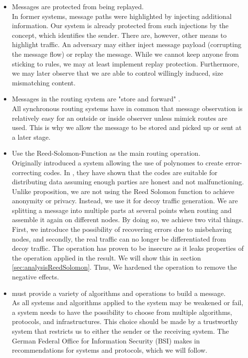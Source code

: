 \begin{itemize}
	\item Messages are protected from being replayed.\\
	In former systems, message paths were highlighted by injecting additional information. Our system is already protected from such injections by the  concept, which identifies the sender. There are, however, other means to highlight traffic. An adversary may either inject message payload (corrupting the message flow) or replay the message. While we cannot keep anyone from sticking to rules, we may at least implement replay protection. Furthermore, we may later observe that we are able to control willingly induced, size mismatching content.
	\item Messages in the routing system are "store and forward" .\\
	All synchronous routing systems have in common that message observation is relatively easy for an outside or inside observer unless mimick routes are used. This is why we allow the message to be stored and picked up or sent at a later stage. 
	\item Use the Reed-Solomon-Function as the main routing operation.\\
	Originally \cite{reed1960polynomial} introduced a system allowing the use of polynomes to create error-correcting codes. In \cite{chaum1988multiparty} \citeauthor{chaum1988multiparty}, they have shown that the codes are suitable for distributing data assuming enough parties are honest and not malfunctioning. Unlike \citeauthor{chaum1988multiparty} proposition, we are not using the Reed Solomon function to achieve anonymity or privacy. Instead, we use it for decoy traffic generation. We are splitting a message into multiple parts at several points when routing and assemble it again on different nodes. By doing so, we achieve two vital things. First, we introduce the possibility of recovering errors due to misbehaving nodes, and secondly, the real traffic can no longer be differentiated from decoy traffic. The operation has proven to be insecure as it leaks properties of the operation applied in the result. We will show this in section \ref{sec:analysisReedSolomon}. Thus, We hardened the operation to remove the negative effects.
	\item \MessageVortex{} must provide a variety of algorithms and operations to build a message.\\        
	As all systems and algorithms applied to the system may be weakened or fail, a system needs to have the possibility to choose from multiple algorithms, protocols, and infrastructures. This choice should be made by a trustworthy system that restricts us to either the sender or the receiving system. The German Federal Office for Information Security (BSI) makes in \cite{bsiPostQuantum} recommendations for systems and protocols, which we will follow.
	

\end{itemize}

